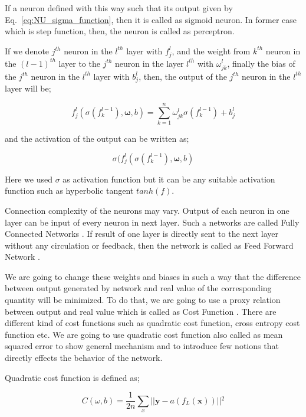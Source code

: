 \documentclass[a4paper,times,12pt]{article}
\begin{document}
If a neuron defined with this way such that its output given by Eq.~\ref{eq:NU_sigma_function}, then it is called as sigmoid neuron. In former case which is step function, then, the neuron is called as perceptron. 

If we denote $j^{th}$ neuron in the $l^{th}$ layer with $f_j^l$, and the weight from $k^{th}$ neuron in the $(l-1)^{th}$ layer to the $j^{th}$ neuron in the layer $l^{th}$ with $\omega_{jk}^l$, finally the bias of the $j^{th}$ neuron in the $l^{th}$ layer with ${b_j^l}$, then, the output of the $j^{th}$ neuron in the $l^{th}$ layer will be;

\begin{equation}
\label{eq:NU_neuron_connection}
f_j^{l}(\sigma(f_k^{l-1}), \boldsymbol{\omega}, b) = \sum\limits_{k=1}^{n} \omega_{jk}^{l}\sigma(f_k^{l-1}) + b_j^l
\end{equation}

\noindent and the activation of the output can be written as;

\begin{equation}
\sigma(f_j^{l}(\sigma(f_k^{l-1}), \boldsymbol{\omega}, b)
\end{equation}


\noindent Here we used $\sigma$ as activation function but it can be any suitable activation function such as hyperbolic tangent $tanh(f)$.  

Connection complexity of the neurons may vary. Output of each neuron in one layer can be input of every neuron in next layer. Such a networks are called Fully Connected Networks \cite{nielsen2015neural}. If result of one layer is directly sent to the next layer without any circulation or feedback, then the network is called as Feed Forward Network \cite{nielsen2015neural}.

We are going to change these weights and biases in such a way that the difference between output generated by network and real value of the corresponding quantity will be minimized. To do that, we are going to use a proxy relation between output and real value which is called as Cost Function \cite{nielsen2015neural}. There are different kind of cost functions such as quadratic cost function, cross entropy cost function etc. We are going to use quadratic cost function also called as mean squared error to show general mechanism and to introduce few notions that directly effects the behavior of the network. 


Quadratic cost function is defined as;

\begin{equation}
\label{eq:NT_Quadratic}
C(\omega, b) = \frac{1}{2n} \sum\limits_{x} || \boldsymbol{y} - a(f_L(\boldsymbol{x})) ||{^2} 
\end{equation}
\end{document}
